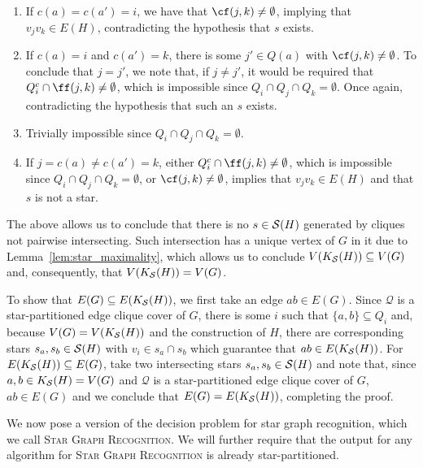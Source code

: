 \begin{tproof}
    \begin{enumerate}
        \item If $c(a) = c(a') = i$, we have that $\cf(j,k)  \neq \emptyset$, implying that $v_jv_k \in E(H)$, contradicting the hypothesis that $s$ exists.
        \item If $c(a) = i$ and $c(a') = k$, there is some $j' \in Q(a)$ with $\cf(j,k) \neq \emptyset$. To conclude that $j = j'$, we note that, if $j \neq j'$, it would be required that $Q_i^c \cap \ff(j,k) \neq \emptyset$, which is impossible since $Q_i \cap Q_j \cap Q_k = \emptyset$.
        Once again, contradicting the hypothesis that such an $s$ exists.
        \item Trivially impossible since $Q_i \cap Q_j \cap Q_k = \emptyset$.
        \item If $j = c(a) \neq c(a') = k$, either $Q_i^c \cap \ff(j,k) \neq \emptyset$, which is impossible since $Q_i \cap Q_j \cap Q_k = \emptyset$, or $\cf(j,k) \neq \emptyset$, implies that $v_jv_k \in E(H)$ and that $s$ is not a star.
    \end{enumerate}
    
    The above allows us to conclude that there is no $s \in \mathcal{S}(H)$ generated by cliques not pairwise intersecting.
    Such intersection has a unique vertex of $G$ in it due to Lemma~\ref{lem:star_maximality}, which allows us to conclude $V(K_{\mathcal{S}}(H)) \subseteq V(G)$ and, consequently, that $V(K_{\mathcal{S}}(H)) = V(G)$.
    
    To show that $E(G) \subseteq E(K_{\mathcal{S}}(H))$, we first take an edge $ab \in E(G)$.
    Since $\mathcal{Q}$ is a star-partitioned edge clique cover of $G$, there is some $i$ such that $\{a,b\} \subseteq Q_i$ and, because $V(G) = V(K_{\mathcal{S}}(H))$ and the construction of $H$, there are corresponding stars $s_a, s_b \in \mathcal{S}(H)$ with $v_i \in s_a \cap s_b$ which guarantee that $ab \in E(K_{\mathcal{S}}(H))$.
    For $E(K_{\mathcal{S}}(H)) \subseteq E(G)$, take two intersecting stars $s_a,s_b \in \mathcal{S}(H)$ and note that, since $a,b \in K_{\mathcal{S}}(H) = V(G)$ and $\mathcal{Q}$ is a star-partitioned edge clique cover of $G$, $ab \in E(G)$ and we conclude that $E(G) = E(K_{\mathcal{S}}(H))$, completing the proof.
\end{tproof}

We now pose a version of the decision problem for star graph recognition, which we call \textsc{Star Graph Recognition}.
We will further require that the output for any algorithm for \textsc{Star Graph Recognition} is already star-partitioned.


